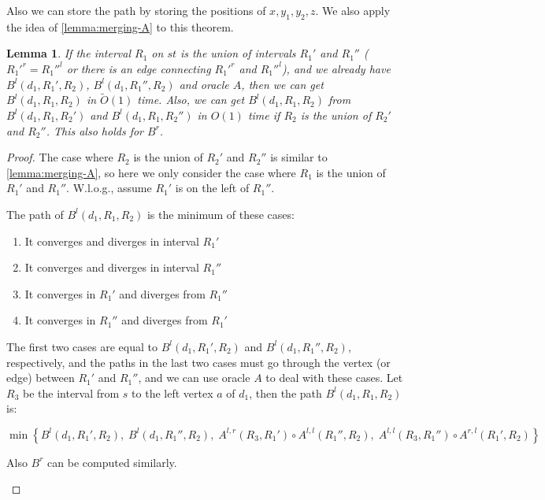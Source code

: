 \documentclass[11pt]{article}
\theoremstyle{plain}
\newtheorem{lemma}[theorem]{Lemma}
\theoremstyle{definition}
\newcommand{\too}[1]{\tilde{O}({#1})}
\newcommand{\zdd}[1]{{#1}^{l}}
\newcommand{\ydd}[1]{{#1}^{r}}
\begin{document}
Also we can store the path by storing the positions of $x,y_1,y_2,z$. We also apply the idea of \cref{lemma:merging-A} to this theorem.

\begin{lemma}\label{lemma:merging-B}
    If the interval $R_1$ on $st$ is the union of intervals $R_1'$ and $R_1''$ ($\ydd{R_1'}=\zdd{R_1''}$ or there is an edge connecting $\ydd{R_1'}$ and $\zdd{R_1''}$), and we already have $B^l(d_1,R_1',R_2)$, $B^l(d_1,R_1'',R_2)$ and oracle $A$, then we can get $B^l(d_1,R_1,R_2)$ in $\too{1}$ time. Also, we can get $B^l(d_1,R_1,R_2)$ from $B^l(d_1,R_1,R_2')$ and $B^l(d_1,R_1,R_2'')$ in $O(1)$ time if $R_2$ is the union of $R_2'$ and $R_2''$. This also holds for $B^r$.
\end{lemma}
\begin{proof}
    The case where $R_2$ is the union of $R_2'$ and $R_2''$ is similar to \cref{lemma:merging-A}, so here we only consider the case where $R_1$ is the union of $R_1'$ and $R_1''$. W.l.o.g., assume $R_1'$ is on the left of $R_1''$.

    The path of $B^l(d_1,R_1,R_2)$ is the minimum of these cases: 
    \begin{enumerate}
        \item It converges and diverges in interval $R_1'$
        \item It converges and diverges in interval $R_1''$
        \item It converges in $R_1'$ and diverges from $R_1''$
        \item It converges in $R_1''$ and diverges from $R_1'$        
    \end{enumerate}

    The first two cases are equal to $B^l(d_1,R_1',R_2)$ and $B^l(d_1,R_1'',R_2)$, respectively, and the paths in the last two cases must go through the vertex (or edge) between $R_1'$ and $R_1''$, and we can use oracle $A$ to deal with these cases. Let $R_3$ be the interval from $s$ to the left vertex $a$ of $d_1$, then the path $B^l(d_1,R_1,R_2)$ is:


     $$\min\left\{B^l(d_1,R_1',R_2),\; B^l(d_1,R_1'',R_2),\; A^{l,r}(R_3,R_1')\circ A^{l,l}(R_1'',R_2),\; A^{l,l}(R_3,R_1'')\circ A^{r,l}(R_1',R_2)\right\}$$

    Also $B^r$ can be computed similarly.

    \begin{center}
        



\end{center}
\end{proof}
\end{document}
